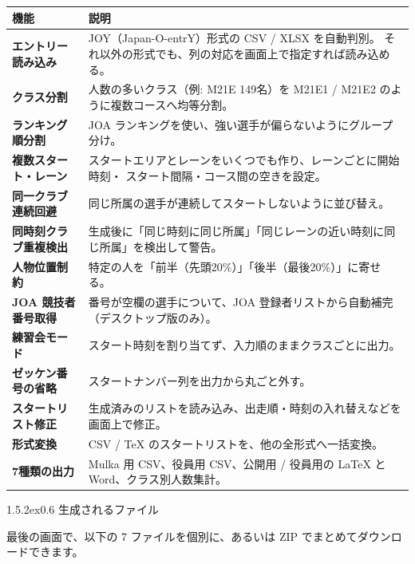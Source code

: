 \documentclass[a4paper,11pt]{ltjsarticle}
\makeatletter
\renewcommand{\subsection}{\@startsection{subsection}{2}{\z@}%
  {1.5\baselineskip \@plus .2ex}{0.6\baselineskip}%
  {\normalfont\large\bfseries\color{brandink}}}
\makeatother
\begin{document}
\begin{center}
\begin{tabular}{@{}>{\bfseries}p{42mm}p{105mm}@{}}
\toprule
\rowcolor{band}\textbf{機能} & \textbf{説明} \\
\midrule
エントリー読み込み & JOY（Japan-O-entrY）形式の CSV / XLSX を自動判別。
それ以外の形式でも、列の対応を画面上で指定すれば読み込める。 \\
クラス分割 & 人数の多いクラス（例: M21E 149名）を M21E1 / M21E2 のように複数コースへ均等分割。 \\
ランキング順分割 & JOA ランキングを使い、強い選手が偏らないようにグループ分け。 \\
複数スタート・レーン & スタートエリアとレーンをいくつでも作り、レーンごとに開始時刻・
スタート間隔・コース間の空きを設定。 \\
同一クラブ連続回避 & 同じ所属の選手が連続してスタートしないように並び替え。 \\
同時刻クラブ重複検出 & 生成後に「同じ時刻に同じ所属」「同じレーンの近い時刻に同じ所属」を検出して警告。 \\
人物位置制約 & 特定の人を「前半（先頭20\%）」「後半（最後20\%）」に寄せる。 \\
JOA 競技者番号取得 & 番号が空欄の選手について、JOA 登録者リストから自動補完（デスクトップ版のみ）。 \\
練習会モード & スタート時刻を割り当てず、入力順のままクラスごとに出力。 \\
ゼッケン番号の省略 & スタートナンバー列を出力から丸ごと外す。 \\
スタートリスト修正 & 生成済みのリストを読み込み、出走順・時刻の入れ替えなどを画面上で修正。 \\
形式変換 & CSV / TeX のスタートリストを、他の全形式へ一括変換。 \\
7種類の出力 & Mulka 用 CSV、役員用 CSV、公開用 / 役員用の LaTeX と Word、クラス別人数集計。 \\
\bottomrule
\end{tabular}
\end{center}

\subsection{生成されるファイル}
\label{sec:files}

最後の画面で、以下の 7 ファイルを個別に、あるいは ZIP でまとめてダウンロードできます。
\end{document}
